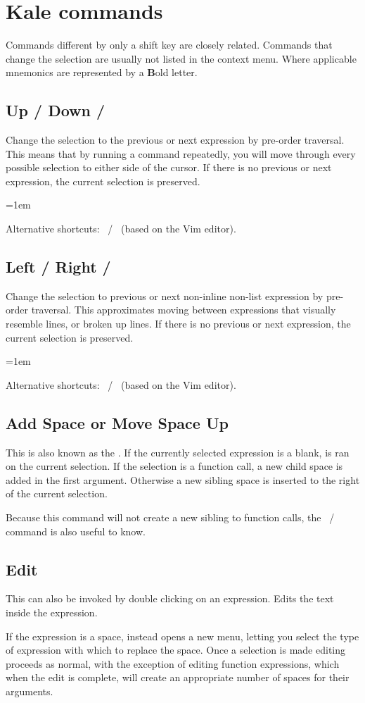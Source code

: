 \chapter{Kale commands}
\newcommand{\shortcut}[3]{\section[#1]{#1 \hfill #2}\label{cmd:#3}}
\newcommand{\pskip}[1]{{\parskip=1em\par\noindent #1}}

Commands different by only a shift key \keys{\shift} are closely
related. Commands that change the selection are usually not listed in the
context menu. Where applicable mnemonics are represented by a \textbf{B}old
letter.

\shortcut{Up / Down}{\ak{^} / }{up_down}
Change the selection to the previous or next expression by pre-order traversal.
This means that by running a command repeatedly, you will move through every
possible selection to either side of the cursor. If there is no previous or
next expression, the current selection is preserved.
\pskip{Alternative shortcuts: ~/~ (based on the Vim editor).}

\shortcut{Left / Right}{\ak{<} / \ak{>}}{left_right}
Change the selection to previous or next non-inline non-list expression by
pre-order traversal. This approximates moving between expressions that visually
resemble lines, or broken up lines. If there is no previous or next expression,
the current selection is preserved.
\pskip{Alternative shortcuts: ~/~ (based on the Vim editor).}

\shortcut{Add Space or Move Space Up}{\keys{\SPACE}}{smart_space}
This is also known as the . If the currently selected
expression is a blank, \hyperref[cmd:move_up]{} is ran on the
current selection. If the selection is a function call, a new child space
is added in the first argument. Otherwise a new sibling space is inserted to
the right of the current selection. 

Because this command will not create a new sibling to function calls, the 
\hyperref[cmd:new_line]{}
~/~ 
command is also useful to know.

\shortcut{Edit}{\keys{\return}}{edit}
This can also be invoked by double clicking on an expression. Edits the text
inside the expression.

If the expression is a space, instead opens a new menu,
letting you select the type of expression with which to replace the space. 
Once a selection is made editing proceeds as normal, with the exception of
editing function expressions, which when the edit is complete, will create
an appropriate number of spaces for their arguments.

